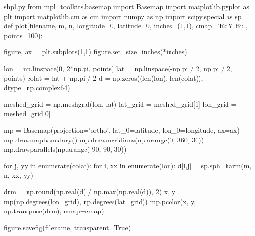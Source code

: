 \begin{filecontents*}{shpl.py}
from mpl_toolkits.basemap import Basemap
import matplotlib.pyplot as plt
import matplotlib.cm as cm
import numpy as np
import scipy.special as sp
def plot(filename, m, n, longitude=0, latitude=0, inches=(1,1), 
         cmap='RdYlBu', points=100):

    figure, ax = plt.subplots(1,1)
    figure.set_size_inches(*inches)

    lon = np.linspace(0, 2*np.pi, points)
    lat = np.linspace(-np.pi / 2, np.pi / 2, points)
    colat = lat + np.pi / 2
    d = np.zeros((len(lon), len(colat)), dtype=np.complex64)

    meshed_grid = np.meshgrid(lon, lat)
    lat_grid = meshed_grid[1]
    lon_grid = meshed_grid[0]

    mp = Basemap(projection='ortho', lat_0=latitude, lon_0=longitude, ax=ax)
    mp.drawmapboundary()
    mp.drawmeridians(np.arange(0, 360, 30))
    mp.drawparallels(np.arange(-90, 90, 30))

    for j, yy in enumerate(colat):
        for i, xx in enumerate(lon):
            d[i,j] = sp.sph_harm(m, n, xx, yy)

    drm = np.round(np.real(d) / np.max(np.real(d)), 2)
    x, y = mp(np.degrees(lon_grid), np.degrees(lat_grid))
    mp.pcolor(x, y, np.transpose(drm), cmap=cmap)

    figure.savefig(filename, transparent=True)
\end{filecontents*}

\newif\ifshpoverwrite
{}
\def\sphericalharmonicplot#1{%
  \tikzset{spherical harmonics/.cd,#1}%
  \edef\pythoncommand{python -c "import shpl; 
    shpl.plot('\shpfilename', \shpm, \shpn,
              latitude=\shplatitude, longitude=\shplongitude,
              cmap='\shpcmap', points=\shppoints, inches=\shpinches)"}%
  \ifshpoverwrite
    \immediate\write18{\pythoncommand}%
  \else
    \IfFileExists{\shpfilename}{}{\immediate\write18{\pythoncommand}}%
  \fi%
  \texttt{[image: \\shpfilename]}%
}
 
